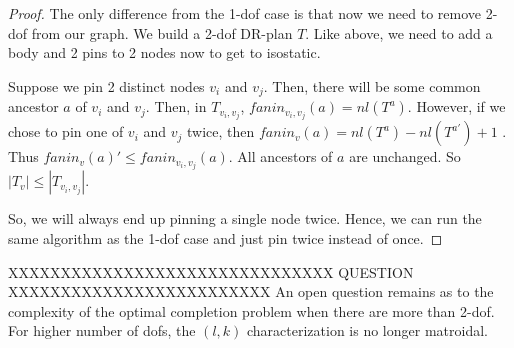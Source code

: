 \begin{proof}
    The only difference from the 1-dof case is that now we need to remove 2-dof from our graph. We build a 2-dof DR-plan $T$. Like above, we need to add a body and 2 pins to 2 nodes now to get to isostatic. 

    Suppose we pin 2 distinct nodes $v_i$ and $v_j$. Then, there will be some common ancestor $a$ of $v_i$ and $v_j$. Then, in $T_{v_i,v_j}$, $fanin_{v_i,v_j}(a) = nl(T^a)$. However, if we chose to pin one of $v_i$ and $v_j$ twice, then $fanin_v(a) = nl(T^a) - nl(T^{a'}) +1$ . Thus $fanin_v(a)' \leq fanin_{v_i,v_j}(a)$. All ancestors of $a$ are unchanged. So $|T_v| \leq |T_{v_i,v_j}|$.

    So, we will always end up pinning a single node twice. Hence, we can run the same algorithm as the 1-dof case and just pin twice instead of once.
\end{proof}



XXXXXXXXXXXXXXXXXXXXXXXXXXXXXXX QUESTION XXXXXXXXXXXXXXXXXXXXXXXXX
An open question remains as to the complexity of the optimal completion problem when there are more than 2-dof. For higher number of dofs, the $(l,k)$ characterization is no longer matroidal.

